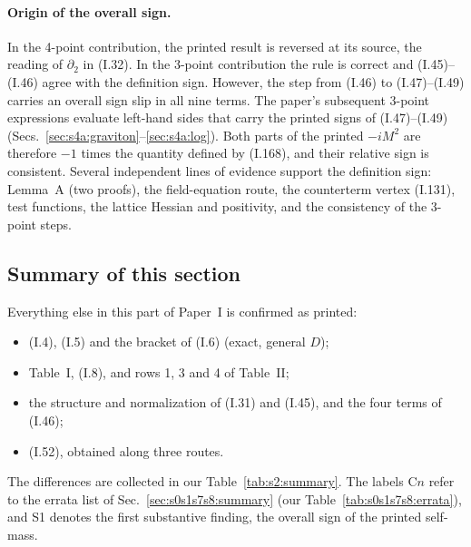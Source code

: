 \documentclass[aps,prd,onecolumn,10pt,nofootinbib,floatfix]{revtex4-2}
\newcommand{\PI}{Paper~I}
\newcommand{\eqI}[1]{(I.#1)}
\begin{document}
\paragraph*{Origin of the overall sign.}
In the 4-point contribution, the printed result is reversed at its source,
the reading of $\partial_2$ in \eqI{32}. In the 3-point contribution the rule
is correct and \eqI{45}--\eqI{46} agree with the definition sign. However,
the step from \eqI{46} to \eqI{47}--\eqI{49} carries an overall sign slip in
all nine terms. The paper's subsequent 3-point expressions evaluate
left-hand sides that carry the printed signs of \eqI{47}--\eqI{49}
(Secs.~\ref{sec:s4a:graviton}--\ref{sec:s4a:log}). Both parts of the printed $-iM^2$ are therefore $-1$
times the quantity defined by \eqI{168}, and their relative sign is
consistent. Several independent lines of evidence support the definition
sign: Lemma~A (two proofs), the field-equation route, the counterterm vertex
\eqI{131}, test functions, the lattice Hessian and positivity, and the
consistency of the 3-point steps.

\subsection{Summary of this section}
\label{sec:s2:summary}

Everything else in this part of \PI{} is confirmed as printed:
\begin{itemize}
\item \eqI{4}, \eqI{5} and the bracket of \eqI{6} (exact, general $D$);
\item Table~I, \eqI{8}, and rows 1, 3 and 4 of Table~II;
\item the structure and normalization of \eqI{31} and \eqI{45}, and the four
terms of \eqI{46};
\item \eqI{52}, obtained along three routes.
\end{itemize}
The differences are collected in our Table~\ref{tab:s2:summary}. The
labels C$n$ refer to the errata list of
Sec.~\ref{sec:s0s1s7s8:summary} (our Table~\ref{tab:s0s1s7s8:errata}), and
S1 denotes the first substantive finding, the overall sign of the printed
self-mass.
\end{document}

